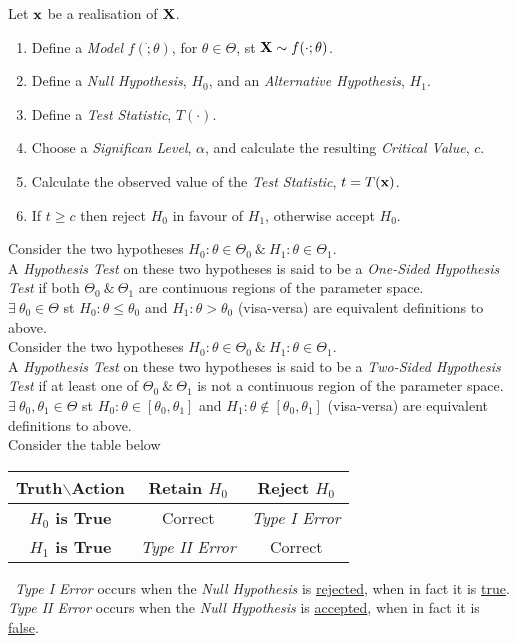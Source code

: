 \documentclass[11pt,a4paper]{article}
\begin{document}
Let $\textbf{x}$ be a realisation of $\textbf{X}$.
\begin{enumerate}
	\item Define a \textit{Model} $f(\dot;\theta)$, for $\theta\in\Theta$, st $\textbf{X}\sim f(\cdot;\theta)$.
	\item Define a \textit{Null Hypothesis}, $H_0$, and an \textit{Alternative Hypothesis}, $H_1$.
	\item Define a \textit{Test Statistic}, $T(\cdot)$.
	\item Choose a \textit{Significan Level}, $\alpha$, and calculate the resulting \textit{Critical Value}, $c$.
	\item Calculate the observed value of the \textit{Test Statistic}, $t=T(\textbf{x})$.
	\item If $t\geq c$ then reject $H_0$ in favour of $H_1$, otherwise accept $H_0$.
\end{enumerate}

Consider the two hypotheses $H_0:\theta\in\Theta_0\ \&\ H_1:\theta\in\Theta_1$.\\
A \textit{Hypothesis Test} on these two hypotheses is said to be a \textit{One-Sided Hypothesis Test} if both $\Theta_0\ \&\ \Theta_1$ are continuous regions of the parameter space.\\
\ie $\exists\ \theta_0\in\Theta$ st $H_0:\theta\leq\theta_0$ and $H_1:\theta>\theta_0$ (visa-versa) are equivalent definitions to above.\\

Consider the two hypotheses $H_0:\theta\in\Theta_0\ \&\ H_1:\theta\in\Theta_1$.\\
A \textit{Hypothesis Test} on these two hypotheses is said to be a \textit{Two-Sided Hypothesis Test} if at least one of $\Theta_0\ \&\ \Theta_1$ is not a continuous region of the parameter space.\\
\ie $\exists\ \theta_0,\theta_1\in\Theta$ st $H_0:\theta\in[\theta_0,\theta_1]$ and $H_1:\theta\not\in[\theta_0,\theta_1]$ (visa-versa) are equivalent definitions to above.\\

Consider the table below
\begin{center}
\begin{tabular}{|c|cc|}
\hline
Truth$\backslash$Action&\textbf{Retain $H_0$}&\textbf{Reject $H_0$}\\
\hline
\textbf{$H_0$ is True}&Correct&\textit{Type I Error}\\
\textbf{$H_1$ is True}&\textit{Type II Error}&Correct\\
\hline
\end{tabular}
\end{center}
\ \textit{Type I Error} occurs when the \textit{Null Hypothesis} is \underline{rejected}, when in fact it is \underline{true}.\\
\textit{Type II Error} occurs when the \textit{Null Hypothesis} is \underline{accepted}, when in fact it is \underline{false}.\\
\end{document}
